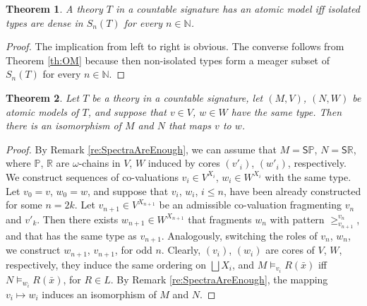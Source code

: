 \documentclass[12pt]{amsart}
\theoremstyle{plain}
\newtheorem{theorem}{Theorem}[section]
\newcommand \Sp{{\mathsf{S}}}
\newcommand \NN{\mathbb{N}}
\newcommand \PPb{\mathbb{P}}
\newcommand \RRb{\mathbb{R}}
\begin{document}
	
	
	
	\begin{theorem}
		A theory $T$ in a countable signature has an atomic model iff isolated types are dense in $S_n(T)$ for every $n \in \NN$.
	\end{theorem}
	
	\begin{proof}
		The implication from left to right is obvious. The converse follows from Theorem \ref{th:OM} because then non-isolated types form a meager subset of $S_n(T)$ for every $n \in \NN$.
	\end{proof}
	
	\begin{theorem}
		\label{th:UniqueAtomic}
		Let $T$ be a theory in a countable signature, let $(M,V)$, $(N,W)$ be atomic models of $T$, and suppose that $v \in V$, $w \in W$ have the same  type. Then there is an isomorphism of $M$ and $N$ that maps $v$ to $w$. 
	\end{theorem}
	
\begin{proof}
	By Remark \ref{re:SpectraAreEnough}, we can assume that $M= \Sp \PPb$, $N=\Sp \RRb$, where $\PPb$, $\RRb$ are $\omega$-chains in $V$, $W$ induced by cores $(v'_i)$, $(w'_i)$, respectively. We  construct sequences of co-valuations $v_i \in V^{X_i}$, $w_i \in W^{X_i}$ with the same type. Let $v_0=v$, $w_0=w$, and suppose that $v_i$, $w_i$, $i \leq n$, have been already constructed for some  $n=2k$. Let $v_{n+1} \in V^{X_{n+1}}$ be an admissible co-valuation fragmenting $v_n$ and $v'_{k}$. Then there exists $w_{n+1} \in W^{X_{n+1}}$ that fragments $w_n$ with pattern $\geq^{v_n}_{v_{n+1}}$, and that has the same type as $v_{n+1}$. Analogously, switching the roles of $v_n$, $w_n$, we construct $w_{n+1}$, $v_{n+1}$, for odd $n$. Clearly, $(v_i)$, $(w_i)$ are cores of $V$, $W$, respectively, they induce the same ordering on $\bigsqcup X_i$, and $M \models_{v_i} R(\bar{x})$ iff $N \models_{w_i} R(\bar{x})$, for $R \in L$. By Remark \ref{re:SpectraAreEnough}, the mapping $v_i \mapsto w_i$ induces an isomorphism of $M$ and $N$. 
\end{proof}
	
\end{document}
